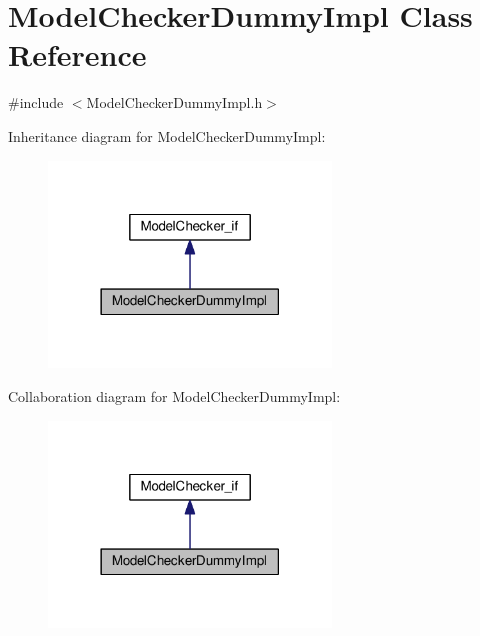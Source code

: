 \hypertarget{class_model_checker_dummy_impl}{}\section{Model\+Checker\+Dummy\+Impl Class Reference}
\label{class_model_checker_dummy_impl}


{\ttfamily \#include $<$Model\+Checker\+Dummy\+Impl.\+h$>$}



Inheritance diagram for Model\+Checker\+Dummy\+Impl\+:
\nopagebreak
\begin{figure}[H]
\begin{center}
\leavevmode
\includegraphics[width=213pt]{class_model_checker_dummy_impl__inherit__graph}
\end{center}
\end{figure}


Collaboration diagram for Model\+Checker\+Dummy\+Impl\+:
\nopagebreak
\begin{figure}[H]
\begin{center}
\leavevmode
\includegraphics[width=213pt]{class_model_checker_dummy_impl__coll__graph}
\end{center}
\end{figure}
